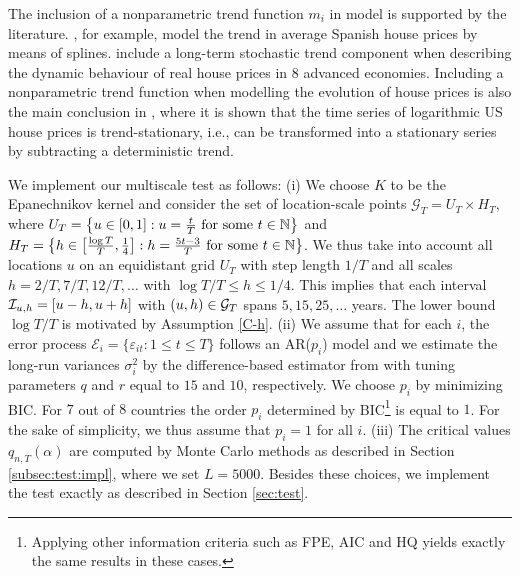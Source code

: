 \documentclass[12pt]{article}
\makeatletter
\renewcommand{\eqref}[1]{\tagform@{\ref{#1}}}
\makeatother
\begin{document}
The inclusion of a nonparametric trend function $m_i$ in model \eqref{eq:model:app4} is supported by the literature. \cite{Ugarte2009}, for example, model the trend in average Spanish house prices by means of splines. \cite{Winter2022} include a long-term stochastic trend component when describing the dynamic behaviour of real house prices in $8$ advanced economies. Including a nonparametric trend function when modelling the evolution of house prices is also the main conclusion in \cite{Zhang2016}, where it is shown that the time series of logarithmic US house prices is trend-stationary, i.e., can be transformed into a stationary series by subtracting a deterministic trend.


We implement our multiscale test as follows: 
(i) We choose $K$ to be the Epanechnikov kernel and consider the set of location-scale points $\mathcal{G}_T = U_T \times H_T$, where $U_T = \big\{ u \in [0,1]: u = \textstyle{\frac{t}{T}} \text{ for some } t \in \mathbb{N} \big\}$ and $H_T = \big\{ h \in \big[ \textstyle{\frac{\log T}{T}}, \textstyle{\frac{1}{4}} \big]:  h = \textstyle{\frac{5t - 3}{T}} \text{ for some } t \in \mathbb{N} \big\}$. We thus take into account all locations $u$ on an equidistant grid $U_T$ with step length $1/T$ and all scales $h=2/T, 7/T, 12/T,\ldots$ with $\log T /T \le h \le 1/4$. This implies that each interval $\mathcal{I}_{u, h} =[u-h,u+h]$ with $(u,h) \in \mathcal{G}_T$ spans $5, 15, 25, \ldots$ years. The lower bound $\log T / T$ is motivated by Assumption \ref{C-h}. 
(ii) We assume that for each $i$, the error process $\mathcal{E}_i = \{\varepsilon_{it}: 1 \leq t \leq T\}$ follows an AR($p_i$) model and we estimate the long-run variances $\sigma_i^2$ by the difference-based estimator from \cite{KhismatullinaVogt2020} with tuning parameters $q$ and $r$ equal to $15$ and $10$, respectively. We choose $p_i$ by minimizing BIC. For $7$ out of $8$ countries the order $p_i$ determined by BIC\footnote{Applying other information criteria such as FPE, AIC and HQ yields exactly the same results in these cases.} is equal to $1$. For the sake of simplicity, we thus assume that $p_i = 1$ for all $i$.
(iii) The critical values $q_{n, T}(\alpha)$ are computed by Monte Carlo methods as described in Section \ref{subsec:test:impl}, where we set $L=5000$.
Besides these choices, we implement the test exactly as described in Section \ref{sec:test}.  
\end{document}
